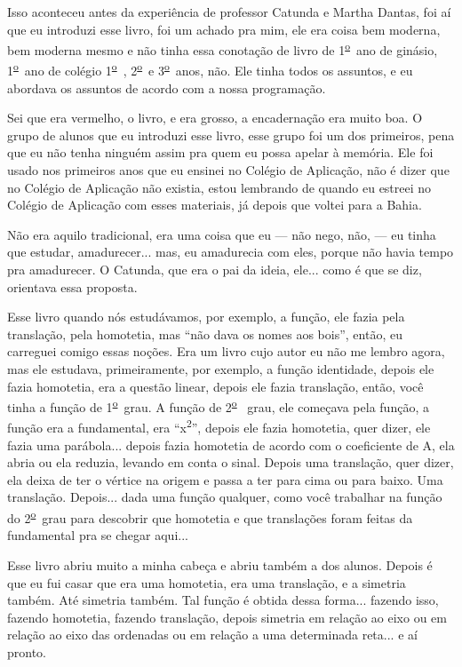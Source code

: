 \documentclass{hipatia}
\newcommand{\superou}{\textsuperscript{\underline{o}}~}
\begin{document}
Isso aconteceu antes da experiência de professor Catunda e Martha
Dantas, foi aí que eu introduzi esse livro, foi um achado pra mim, ele
era coisa bem moderna, bem moderna mesmo e não tinha essa conotação de
livro de 1\superou  ano de ginásio, 1\superou  ano de colégio 1\superou , 2\superou  e 3\superou  anos, não. Ele
tinha todos os assuntos, e eu abordava os assuntos de acordo com a nossa
programação.

Sei que era vermelho, o livro, e era grosso, a encadernação era muito
boa. O grupo de alunos que eu introduzi esse livro, esse grupo foi um
dos primeiros, pena que eu não tenha ninguém assim pra quem eu possa
apelar à memória. Ele foi usado nos primeiros anos que eu ensinei no
Colégio de Aplicação, não é dizer que no Colégio de Aplicação não
existia, estou lembrando de quando eu estreei no Colégio de Aplicação
com esses materiais, já depois que voltei para a Bahia.

Não era aquilo tradicional, era uma coisa que eu --- não nego, não, --- eu
tinha que estudar, amadurecer... mas, eu amadurecia com eles, porque não
havia tempo pra amadurecer. O Catunda, que era o pai da ideia, ele...
como é que se diz, orientava essa proposta.

Esse livro quando nós estudávamos, por exemplo, a função, ele fazia pela
translação, pela homotetia, mas ``não dava os nomes aos bois'', então,
eu carreguei comigo essas noções. Era um livro cujo autor eu não me
lembro agora, mas ele estudava, primeiramente, por exemplo, a função
identidade, depois ele fazia homotetia, era a questão linear, depois ele
fazia translação, então, você tinha a função de 1\superou  grau. A função de 2\superou 
grau, ele começava pela função, a função era a fundamental, era
``x\textsuperscript{2}'', depois ele fazia homotetia, quer dizer, ele
fazia uma parábola... depois fazia homotetia de acordo com o coeficiente
de A, ela abria ou ela reduzia, levando em conta o sinal. Depois uma
translação, quer dizer, ela deixa de ter o vértice na origem e passa a
ter para cima ou para baixo. Uma translação. Depois... dada uma função
qualquer, como você trabalhar na função do 2\superou  grau para descobrir que
homotetia e que translações foram feitas da fundamental pra se chegar
aqui...

Esse livro abriu muito a minha cabeça e abriu também a dos alunos.
Depois é que eu fui casar que era uma homotetia, era uma translação, e a
simetria também. Até simetria também. Tal função é obtida dessa forma...
fazendo isso, fazendo homotetia, fazendo translação, depois simetria em
relação ao eixo ou em relação ao eixo das ordenadas ou em relação a uma
determinada reta... e aí pronto.
\end{document}
